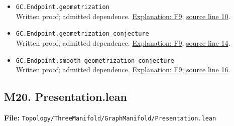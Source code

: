\documentclass[
  letterpaper,
  11pt]{article}
\begin{document}
\begin{itemize}
\item
  {\small\texttt{GC.\allowbreak{}Endpoint.\allowbreak{}geometrization}}\\
  Written proof; admitted dependence.
  \hyperref[f9-capstone]{Explanation: F9};
  \href{https://github.com/qinz1yang/differential-geometry-dev/blob/ea0fae60ee01ef8c8d9b57a51794c6538f679c5d/DifferentialGeometry/Topology/ThreeManifold/Geometrization/Theorem.lean\#L10}{source
  line 10}.
\item
  {\small\texttt{GC.\allowbreak{}Endpoint.\allowbreak{}geometrization\_\allowbreak{}conjecture}}\\
  Written proof; admitted dependence.
  \hyperref[f9-capstone]{Explanation: F9};
  \href{https://github.com/qinz1yang/differential-geometry-dev/blob/ea0fae60ee01ef8c8d9b57a51794c6538f679c5d/DifferentialGeometry/Topology/ThreeManifold/Geometrization/Theorem.lean\#L14}{source
  line 14}.
\item
  {\small\texttt{GC.\allowbreak{}Endpoint.\allowbreak{}smooth\_\allowbreak{}geometrization\_\allowbreak{}conjecture}}\\
  Written proof; admitted dependence.
  \hyperref[f9-capstone]{Explanation: F9};
  \href{https://github.com/qinz1yang/differential-geometry-dev/blob/ea0fae60ee01ef8c8d9b57a51794c6538f679c5d/DifferentialGeometry/Topology/ThreeManifold/Geometrization/Theorem.lean\#L16}{source
  line 16}.
\end{itemize}


\subsection{M20. Presentation.lean}\label{m20.-presentation.lean}

\textbf{File:}
{\small\texttt{Topology/\allowbreak{}Three\allowbreak{}Manifold/\allowbreak{}Graph\allowbreak{}Manifold/\allowbreak{}Presentation.\allowbreak{}lean}}
\end{document}
